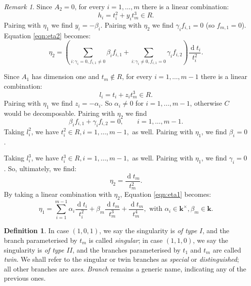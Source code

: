 \documentclass{compositio}
\renewcommand{\k}{\mathbf k}
\theoremstyle{plain}
\theoremstyle{definition}
\newtheorem{definition}[thm]{Definition}
\theoremstyle{remark}
\newtheorem{rem}[thm]{Remark}
\begin{document}
\begin{rem}
Since $A_2=0$, for every $i=1,\ldots,m$ there is a linear combination:
\[ h_i=t_i^2+y_it_m^3\in R.\]
Pairing with $\eta_1$ we find $y_i=-\beta_i$. Pairing with $\eta_2$ we find $\gamma_if_{i,1}=0$ (so $f_{m,1}=0$). Equation \eqref{eqn:eta2} becomes:
\[\eta_2=\left(\sum_{i:\gamma_i=0,f_{i,1}\neq 0}\beta_if_{i,1}+\sum_{i:\gamma_i\neq0,f_{i,1}=0}\gamma_if_{i,2}\right)\frac{\operatorname{d} t_i}{t_i^2}.\]

Since $A_1$ has dimension one and $t_m\notin R$, for every $i=1,\ldots,m-1$ there is a linear combination:
\[ l_i=t_i+z_it_m^3\in R.\]
Pairing with $\eta_1$ we find $z_i=-\alpha_i$. So $\alpha_i\neq0$ for $i=1,\ldots,m-1$, otherwise $C$ would be decomposable. Pairing with $\eta_2$ we find
\begin{equation}\label{eqn:someequation}\beta_if_{i,1}+\gamma_if_{i,2}=0,\qquad i=1,\ldots,m-1.\end{equation}
Taking $l_i^2$, we have $t_i^2\in R, i=1,\ldots,m-1,$ as well. Pairing with $\eta_1$, we find $\beta_i=0$.

\noindent Taking $l_i^3$, we have $t_i^3\in R, i=1,\ldots,m-1,$ as well. Pairing with $\eta_1$, we find $\gamma_i=0$. So, ultimately, we find:
\[\eta_2=\frac{\operatorname{d} t_m}{t_m^2}.\]
By taking a linear combination with $\eta_2$, Equation \eqref{eqn:eta1} becomes:
\[\eta_1=\sum_{i=1}^{m-1} \alpha_i \frac{\operatorname{d} t_i}{t_i^2}+ \beta_m \frac{\operatorname{d} t_m}{t_m^3}+  \frac{\operatorname{d} t_m}{t_m^4}, \text{ with } \alpha_i\in\k^\times,\beta_m\in\k.\]
\end{rem}

\begin{definition}\label{def:special_branches}
 In case $(1,0,1)$, we say the singularity is \emph{of type $I$}, and the branch parameterised by $t_m$ is called \emph{singular}; in case $(1,1,0)$, we say the singularity is \emph{of type $I\!I$}, and the branches parameterised by $t_1$ and $t_m$ are called \emph{twin}. We shall refer to the singular or twin branches as \emph{special} or \emph{distinguished}; all other branches are \emph{axes}. \emph{Branch} remains a generic name, indicating any of the previous ones.
\end{definition}
\end{document}
